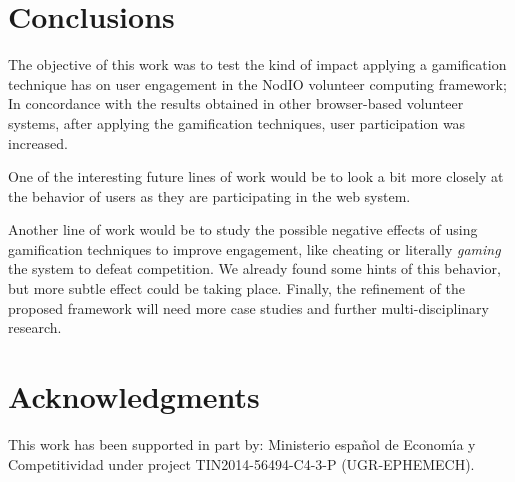 \documentclass{llncs}
\begin{document}
\section{Conclusions}
\label{sec:conclusions}

The objective of this work was to test the kind of impact 
applying a gamification technique has on user engagement in 
the {\sf NodIO} volunteer computing framework; In concordance with 
the results obtained in other 
browser-based volunteer systems, after 
applying the gamification techniques, user participation was increased. 

One of the interesting future lines of work would be to look a bit
more closely at the behavior of users as they are participating  
in the web system. 

Another line of work would be to study the possible negative effects of using  
gamification techniques to improve engagement, like cheating or
literally {\em gaming} the system to defeat competition. We already
found some hints of this behavior, but more subtle effect could be taking place. 
Finally, the refinement of the proposed framework will need
more case studies and further multi-disciplinary research.


\section*{Acknowledgments}

This work has been supported in part by: Ministerio espa\~{n}ol de
Econom\'{\i}a y Competitividad under project TIN2014-56494-C4-3-P
(UGR-EPHEMECH).




\end{document}
